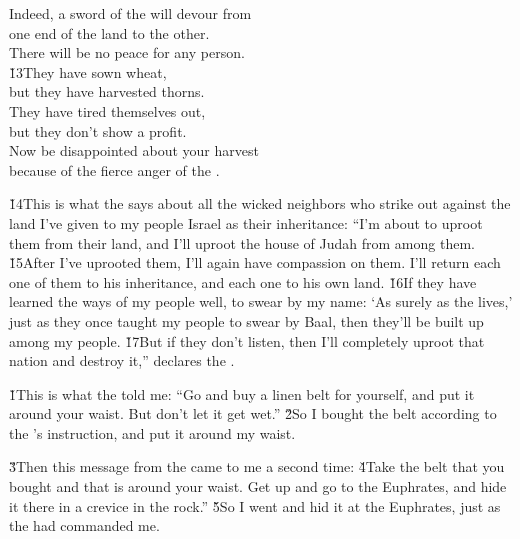 \begin{poetry}
\poeml Indeed, a sword of the  will devour from \\
\poemll    one end of the land to the other. \\
\poeml There will be no peace for any person. \\
\poeml \v{13}They have sown wheat, \\
\poemll    but they have harvested thorns. \\
\poeml They have tired themselves out, \\
\poemll    but they don't show a profit. \\
\poeml Now be disappointed about your harvest \\
\poemll    because of the fierce anger of the .
\end{poetry}

\v{14}This is what the  says about all the wicked neighbors who strike out against the land I've given to my people Israel as their inheritance: ``I'm about to uproot them from their land, and I'll uproot the house of Judah from among them. \v{15}After I've uprooted them, I'll again have compassion on them. I'll return each one of them to his inheritance, and each one to his own land. \v{16}If they have learned the ways of my people well, to swear by my name: `As surely as the  lives,' just as they once taught my people to swear by Baal, then they'll be built up among my people. \v{17}But if they don't listen, then I'll completely uproot that nation and destroy it,'' declares the .

\v{1}This is what the  told me: ``Go and buy a linen belt for yourself, and put it around your waist. But don't let it get wet.'' \v{2}So I bought the belt according to the 's instruction, and put it around my waist.

\v{3}Then this message from the  came to me a second time: \v{4}Take the belt that you bought and that is around your waist. Get up and go to the Euphrates, and hide it there in a crevice in the rock.'' \v{5}So I went and hid it at the Euphrates, just as the  had commanded me.

